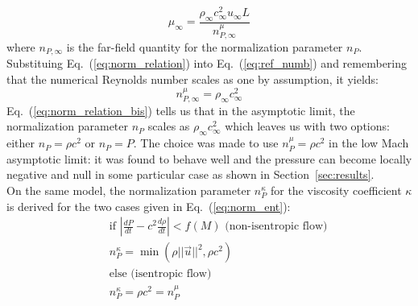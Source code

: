 \documentclass[preprint,10pt]{elsarticle}
\newcommand{\eqt}[1]{Eq.~(\ref{#1})}                     %
\newcommand{\sct}[1]{Section~\ref{#1}}                   %
\begin{document}
\begin{equation}
\label{eq:norm_relation}
\mu_\infty = \frac{ \rho_\infty c_\infty^2 u_\infty L }{ n_{P,\infty}^{\mu} } 
\end{equation}
where $n_{P,\infty}$ is the far-field quantity for the normalization parameter $n_P$. Substituing \eqt{eq:norm_relation} into \eqt{eq:ref_numb} and remembering that the numerical Reynolds number scales as one by assumption, it yields:
\begin{equation}
\label{eq:norm_relation_bis}
n_{P,\infty}^{\mu} = \rho_\infty c_\infty^2
\end{equation}
\eqt{eq:norm_relation_bis} tells us that in the asymptotic limit, the normalization parameter $n_P$ scales as $\rho_\infty c_\infty^2$ which leaves us with two options:
either $n_P = \rho c^2$ or $n_P = P$. The choice was made to use $n_P^{\mu} = \rho c^2$ in the low Mach asymptotic limit: it was found to behave well and the pressure can become locally negative and null in some particular case as shown in \sct{sec:results}. \\
On the same model, the normalization parameter $n_P^{\kappa}$ for the viscosity coefficient $\kappa$ is derived for the two cases given in \eqt{eq:norm_ent}:
\begin{eqnarray}  \label{eq:norm_ent2}
&&\text{if } \left| \frac{dP}{dt} - c^2 \frac{d \rho}{dt}\right| < f(M) \text{ (non-isentropic flow)}\nonumber \\
&&n_{P}^{\kappa} =\min( \rho ||\vec{u} ||^2, \rho c^2  ) \nonumber \\
&&\text{else (isentropic flow)}\\
&&n_{P}^{\kappa} = \rho c^2 = n_{P}^{\mu} \nonumber
\end{eqnarray}
\end{document}
